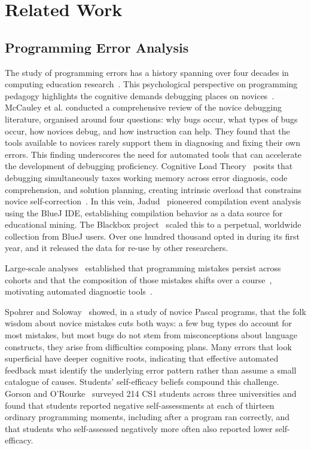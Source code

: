 \documentclass[acmsmall]{acmart}
\begin{document}
\section{Related Work}

\subsection{Programming Error Analysis}

The study of programming errors has a history spanning over four decades
in computing education research~\cite{winslow1996programming}. This psychological perspective on
programming pedagogy highlights the cognitive demands debugging places on novices~\cite{winslow1996programming}.
McCauley et al.\cite{mccauley2008evidence} conducted a comprehensive review of the
novice debugging literature, organised around four questions: why bugs occur,
what types of bugs occur, how novices debug, and how instruction can help. They
found that the tools available to novices rarely support them in diagnosing and
fixing their own errors. This finding underscores the need for automated tools that can
accelerate the development of debugging proficiency. Cognitive Load Theory~\cite{sweller2011cognitive} posits that debugging simultaneously
taxes working memory across error diagnosis, code comprehension, and solution planning,
creating intrinsic overload that constrains novice self-correction~\cite{kirschner2018cognitive}. In this vein, Jadud~\cite{jadud2006methods} pioneered compilation event analysis using the BlueJ IDE, establishing compilation behavior as a data source for educational mining. The Blackbox project~\cite{brown2014blackbox} scaled this to a perpetual, worldwide collection from BlueJ users. Over one hundred thousand opted in during its first year, and it released the data for re-use by other researchers.

Large-scale analyses~\cite{ahadi2015exploring,luxton2018introductory} established that programming mistakes persist across cohorts and that the composition of those mistakes shifts over a course~\cite{altadmri2015most}, motivating automated diagnostic tools~\cite{barbosa2023feedback}.

Spohrer and Soloway~\cite{spohrer1986novice} showed, in a study of novice
Pascal programs, that the folk wisdom about novice mistakes cuts both ways: a
few bug types do account for most mistakes, but most bugs do not stem from
misconceptions about language constructs, they arise from difficulties
composing plans. Many errors that look
superficial have deeper cognitive roots, indicating that effective automated
feedback must identify the underlying error pattern rather than assume a small
catalogue of causes. Students' self-efficacy beliefs compound this challenge. Gorson and O'Rourke~\cite{gorson2020why} surveyed 214 CS1 students across three
universities and found that students reported negative self-assessments at each
of thirteen ordinary programming moments, including after a program ran
correctly, and that students who self-assessed negatively more often also
reported lower self-efficacy.
\end{document}
